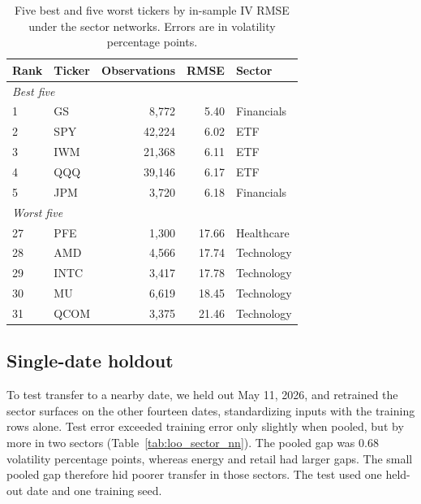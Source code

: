 \begin{table}[H]
\centering
\caption{Median half-spreads and American-option pricing errors on May 11 for the contracts plotted in Fig.~\ref{fig:price_error}. Dollar values are medians across the plotted contracts. The per-ticker error is the absolute difference between the tree price using fitted IV and the market mid. Inside spread is the share of contracts whose absolute per-ticker error was at most their half-spread. The market-IV reference passed each contract's reported IV to the same 200-step CRR tree.}\label{tab:price_error_summary}
\resizebox{\textwidth}{!}{%
}
\end{table}

\begin{table}[H]
\centering
\caption{Five best and five worst tickers by in-sample IV RMSE under the sector networks. Errors are in volatility percentage points.}\label{tab:worst_tickers}
\begin{tabular}{llrrl}
\toprule
Rank & Ticker & Observations & RMSE & Sector \\
\midrule
\multicolumn{5}{l}{\emph{Best five}} \\
 1 & GS   &  8{,}772 & 5.40 & Financials \\
 2 & SPY  & 42{,}224 & 6.02 & ETF \\
 3 & IWM  & 21{,}368 & 6.11 & ETF \\
 4 & QQQ  & 39{,}146 & 6.17 & ETF \\
 5 & JPM  &  3{,}720 & 6.18 & Financials \\
\midrule
\multicolumn{5}{l}{\emph{Worst five}} \\
27 & PFE  &  1{,}300 & 17.66 & Healthcare \\
28 & AMD  &  4{,}566 & 17.74 & Technology \\
29 & INTC &  3{,}417 & 17.78 & Technology \\
30 & MU   &  6{,}619 & 18.45 & Technology \\
31 & QCOM &  3{,}375 & 21.46 & Technology \\
\bottomrule
\end{tabular}
\end{table}

\FloatBarrier
\subsection{Single-date holdout}\label{sec:supp_loo}

To test transfer to a nearby date, we held out May 11, 2026, and retrained the sector surfaces on the other fourteen dates, standardizing inputs with the training rows alone. Test error exceeded training error only slightly when pooled, but by more in two sectors (Table~\ref{tab:loo_sector_nn}). The pooled gap was 0.68 volatility percentage points, whereas energy and retail had larger gaps. The small pooled gap therefore hid poorer transfer in those sectors. The test used one held-out date and one training seed.

